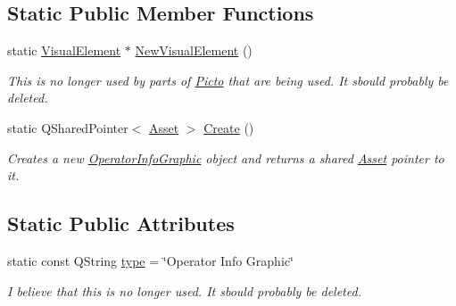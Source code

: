 \subsection*{Static Public Member Functions}
\begin{DoxyCompactItemize}
\item 
\hypertarget{class_picto_1_1_operator_info_graphic_a25bb47c70b8fb5f81f9bdf8c1210f084}{static \hyperlink{struct_picto_1_1_visual_element}{Visual\-Element} $\ast$ \hyperlink{class_picto_1_1_operator_info_graphic_a25bb47c70b8fb5f81f9bdf8c1210f084}{New\-Visual\-Element} ()}\label{class_picto_1_1_operator_info_graphic_a25bb47c70b8fb5f81f9bdf8c1210f084}

\begin{DoxyCompactList}\small\item\em This is no longer used by parts of \hyperlink{namespace_picto}{Picto} that are being used. It sbould probably be deleted. \end{DoxyCompactList}\item 
\hypertarget{class_picto_1_1_operator_info_graphic_adf5efc6a5a07d1c9deefd96be7c4d4c6}{static Q\-Shared\-Pointer$<$ \hyperlink{class_picto_1_1_asset}{Asset} $>$ \hyperlink{class_picto_1_1_operator_info_graphic_adf5efc6a5a07d1c9deefd96be7c4d4c6}{Create} ()}\label{class_picto_1_1_operator_info_graphic_adf5efc6a5a07d1c9deefd96be7c4d4c6}

\begin{DoxyCompactList}\small\item\em Creates a new \hyperlink{class_picto_1_1_operator_info_graphic}{Operator\-Info\-Graphic} object and returns a shared \hyperlink{class_picto_1_1_asset}{Asset} pointer to it. \end{DoxyCompactList}\end{DoxyCompactItemize}
\subsection*{Static Public Attributes}
\begin{DoxyCompactItemize}
\item 
\hypertarget{class_picto_1_1_operator_info_graphic_a1d8d7b2bdec37e34b05e6e1bf1caf5a0}{static const Q\-String \hyperlink{class_picto_1_1_operator_info_graphic_a1d8d7b2bdec37e34b05e6e1bf1caf5a0}{type} = \char`\"{}Operator Info Graphic\char`\"{}}\label{class_picto_1_1_operator_info_graphic_a1d8d7b2bdec37e34b05e6e1bf1caf5a0}

\begin{DoxyCompactList}\small\item\em I believe that this is no longer used. It sbould probably be deleted. \end{DoxyCompactList}\end{DoxyCompactItemize}
